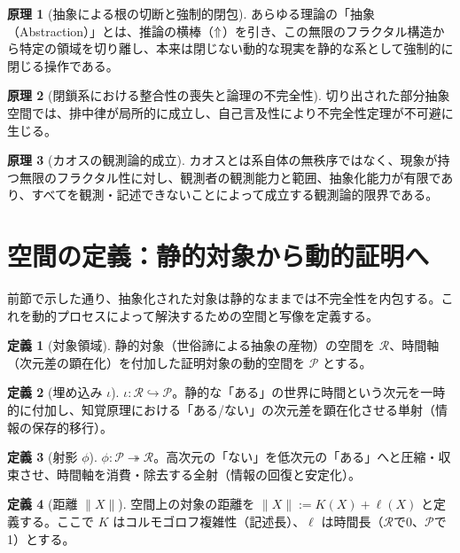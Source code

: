 \documentclass[11pt,a4paper]{article}
\theoremstyle{definition}
\newtheorem{principle}{原理}[section]
\newtheorem{definition}{定義}[section]
\newcommand{\Rep}{\mathcal{R}}   %
\newcommand{\Prf}{\mathcal{P}}   %
\begin{document}
\begin{principle}[抽象による根の切断と強制的閉包]
あらゆる理論の「抽象（Abstraction）」とは、推論の横棒（$\Uparrow$）を引き、この無限のフラクタル構造から特定の領域を切り離し、本来は閉じない動的な現実を静的な系として強制的に閉じる操作である。
\end{principle}

\begin{principle}[閉鎖系における整合性の喪失と論理の不完全性]
切り出された部分抽象空間では、排中律が局所的に成立し、自己言及性により不完全性定理が不可避に生じる。
\end{principle}

\begin{principle}[カオスの観測論的成立]
カオスとは系自体の無秩序ではなく、現象が持つ無限のフラクタル性に対し、観測者の観測能力と範囲、抽象化能力が有限であり、すべてを観測・記述できないことによって成立する観測論的限界である。
\end{principle}

\section{空間の定義：静的対象から動的証明へ}

前節で示した通り、抽象化された対象は静的なままでは不完全性を内包する。これを動的プロセスによって解決するための空間と写像を定義する。

\begin{definition}[対象領域]
静的対象（世俗諦による抽象の産物）の空間を $\Rep$、時間軸（次元差の顕在化）を付加した証明対象の動的空間を $\Prf$ とする。
\end{definition}

\begin{definition}[埋め込み $\iota$]
$\iota: \Rep \hookrightarrow \Prf$。静的な「ある」の世界に時間という次元を一時的に付加し、知覚原理における「ある/ない」の次元差を顕在化させる単射（情報の保存的移行）。
\end{definition}

\begin{definition}[射影 $\phi$]
$\phi: \Prf \twoheadrightarrow \Rep$。高次元の「ない」を低次元の「ある」へと圧縮・収束させ、時間軸を消費・除去する全射（情報の回復と安定化）。
\end{definition}

\begin{definition}[距離 $\|X\|$]
空間上の対象の距離を $\|X\| := K(X) + \ell(X)$ と定義する。ここで $K$ はコルモゴロフ複雑性（記述長）、$\ell$ は時間長（$\Rep$で0、$\Prf$で1）とする。
\end{definition}
\end{document}

